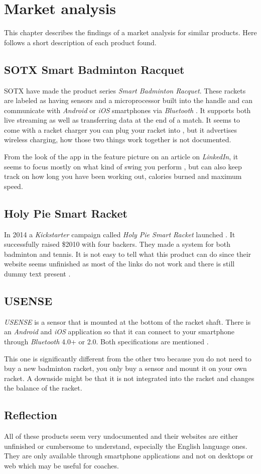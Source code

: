 \chapter{Market analysis}
This chapter describes the findings of a market analysis for similar products. 
Here follows a short description of each product found.

\section*{SOTX Smart Badminton Racquet}
SOTX have made the product series \textit{Smart Badminton Racquet}. 
These rackets are labeled as having sensors and a microprocessor built into the handle and can communicate with \textit{Android} or \textit{iOS} smartphones via \textit{Bluetooth}  \citep{marketAnalysis:sotxsite}. 
It supports both live streaming as well as transferring data at the end of a match. 
It seems to come with a racket charger you can plug your racket into \citep{marketAnalysis:sotxhw}, but it advertises wireless charging, how those two things work together is not documented.

From the look of the app in the feature picture on an article on \textit{LinkedIn}, it seems to focus mostly on what kind of swing you perform \citep{marketAnalysis:sotxapp}, but can also keep track on how long you have been working out, calories burned and maximum speed.

\section*{Holy Pie Smart Racket}
In 2014 a \textit{Kickstarter} campaign called \textit{Holy Pie Smart Racket} launched \citep{marketAnalysis:holypie}. 
It successfully raised \$2010 with four backers. 
They made a system for both badminton and tennis. 
It is not easy to tell what this product can do since their website seems unfinished as most of the links do not work and there is still dummy text present \citep{marketAnalysis:holypi}.

\section*{USENSE}
\textit{USENSE} is a sensor that is mounted at the bottom of the racket shaft. 
There is an \textit{Android} and \textit{iOS} application so that it can connect to your smartphone through \textit{Bluetooth} 4.0+ or 2.0. 
Both specifications are mentioned \citep{marketAnalysis:usense}.
 
This one is significantly different from the other two because you do not need to buy a new badminton racket, you only buy a sensor and mount it on your own racket. 
A downside might be that it is not integrated into the racket and changes the balance of the racket.

\section*{Reflection}
All of these products seem very undocumented and their websites are either unfinished or cumbersome to understand, especially the English language ones. 
They are only available through smartphone applications and not on desktops or web which may be useful for coaches.
